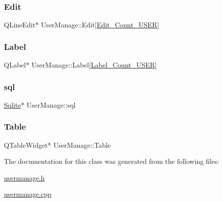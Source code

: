 \subsubsection{\texorpdfstring{Edit}{Edit}}
{\footnotesize\ttfamily Q\+Line\+Edit$\ast$ User\+Manage\+::\+Edit\mbox{[}\mbox{\hyperlink{usermanage_8h_ad566d7b39279371cb1144d506523f783}{Edit\+\_\+\+Count\+\_\+\+U\+S\+ER}}\mbox{]}\hspace{0.3cm}{\ttfamily [private]}}

\mbox{\label{class_user_manage_a4a35260a19fd01d67f4d5e8f76aa1865}} 
\subsubsection{\texorpdfstring{Label}{Label}}
{\footnotesize\ttfamily Q\+Label$\ast$ User\+Manage\+::\+Label\mbox{[}\mbox{\hyperlink{usermanage_8h_abc2d44d68135265538a4352d526067e8}{Label\+\_\+\+Count\+\_\+\+U\+S\+ER}}\mbox{]}\hspace{0.3cm}{\ttfamily [private]}}

\mbox{\label{class_user_manage_ac57f61d7f531b5a48253482ba9493199}} 
\subsubsection{\texorpdfstring{sql}{sql}}
{\footnotesize\ttfamily \mbox{\hyperlink{class_sqlite}{Sqlite}}$\ast$ User\+Manage\+::sql\hspace{0.3cm}{\ttfamily [private]}}

\mbox{\label{class_user_manage_a11482daf138a82958adac62c8f5fc1fe}} 
\subsubsection{\texorpdfstring{Table}{Table}}
{\footnotesize\ttfamily Q\+Table\+Widget$\ast$ User\+Manage\+::\+Table\hspace{0.3cm}{\ttfamily [private]}}



The documentation for this class was generated from the following files\+:\begin{DoxyCompactItemize}
\item 
\mbox{\hyperlink{usermanage_8h}{usermanage.\+h}}\item 
\mbox{\hyperlink{usermanage_8cpp}{usermanage.\+cpp}}\end{DoxyCompactItemize}
